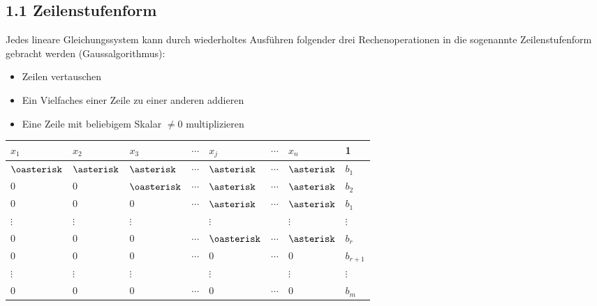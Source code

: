 \subsection{1.1 Zeilenstufenform}{

Jedes lineare Gleichungssystem kann durch wiederholtes Ausführen folgender drei Rechenoperationen in die sogenannte Zeilenstufenform gebracht werden (Gaussalgorithmus):

\begin{itemize}
\item Zeilen vertauschen
\item Ein Vielfaches einer Zeile zu einer anderen addieren
\item Eine Zeile mit beliebigem Skalar $\neq 0$ multiplizieren
\end{itemize}

\vskip4mm

\renewcommand{\arraystretch}{1.3}
\begin{center}
  \begin{tabular}{C{2mm}  C{2mm}  C{2mm}  C{2mm}  C{2mm}  C{2mm}  C{2mm} | C{2mm}}
    $x_1$ & $x_2$ & $x_3$ & $\dotsm$ & $x_j$ & $\dotsm$ & $x_n$ & 1 \\ \hline
    $\oasterisk$ & $\asterisk$ & $\asterisk$ & $\dotsm$ & $\asterisk$ & $\dotsm$ & $\asterisk$ & $b_1$ \\ 
    $0$ & $0$ &  & $\dotsm$ & $\asterisk$ & $\dotsm$ & $\asterisk$ & $b_2$ \\ 
    $0$ & $0$ & $0$ & $\dotsm$ & $\asterisk$ & $\dotsm$ & $\asterisk$ & $b_1$ \\
    $\vdots$ & $\vdots$ & $\vdots$ &  & $\vdots$ & & $\vdots$ & $\vdots$ \\
    $0$ & $0$ & $0$ & $\dotsm$ &  & $\dotsm$ & $\asterisk$ & $b_r$ \\ 
    $0$ & $0$ & $0$ & $\dotsm$ & $0$ & $\dotsm$ & $0$ & $b_{r+1}$ \\
    $\vdots$ & $\vdots$ & $\vdots$ &  & $\vdots$ & & $\vdots$ & $\vdots$ \\
    $0$ & $0$ & $0$ & $\dotsm$ & $0$ & $\dotsm$ & $0$ & $b_m$ \\
  \end{tabular}
\end{center}

}
